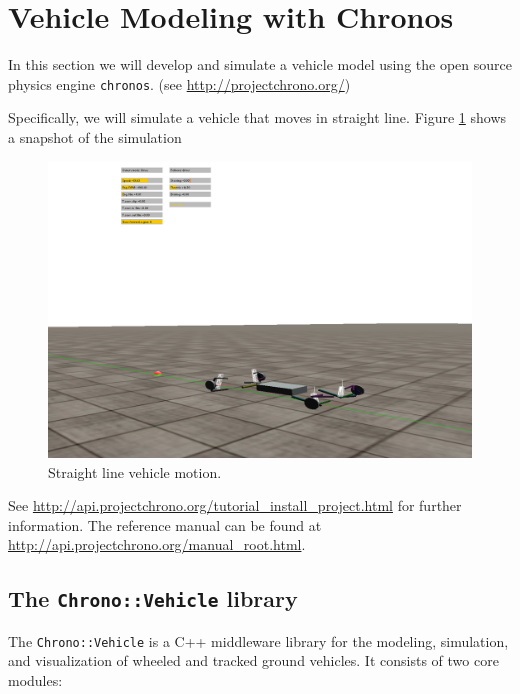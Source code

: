 \section{Vehicle Modeling with Chronos}
\label{vehicle_modeling_chronos}

In this section we will develop and simulate a vehicle model using the open source physics engine \lstinline{chronos}.
(see \url{http://projectchrono.org/})

 
Specifically, we will simulate a vehicle that moves in straight line.  Figure \ref{straight_line_motion} shows a snapshot of the simulation

\begin{figure}[!htb]
\begin{center}
\includegraphics[scale=0.290]{img/straight_line_motion.png}
\end{center}
\caption{Straight line vehicle motion.}
\label{straight_line_motion}
\end{figure}

See \url{http://api.projectchrono.org/tutorial_install_project.html} for further information. The reference manual can be found at
\url{http://api.projectchrono.org/manual_root.html}.

\subsection{The \lstinline{Chrono::Vehicle} library}

The \lstinline{Chrono::Vehicle} is a C++ middleware library for the modeling, simulation, and visualization of wheeled and tracked ground vehicles.
It consists of two core modules:

